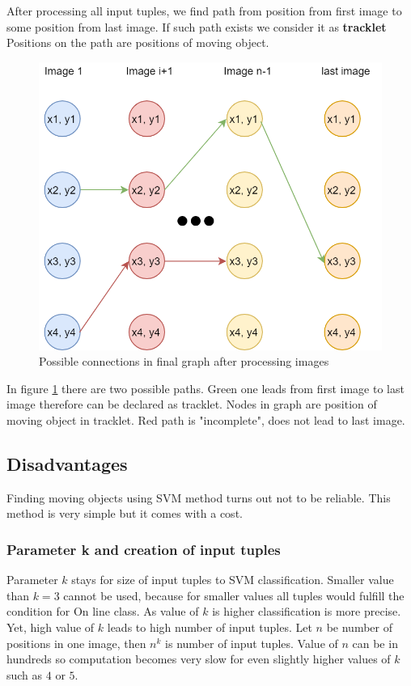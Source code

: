 After processing all input tuples, we find path from position from first image to some position from last image. If such path exists we consider it as \textbf{tracklet} Positions on the path are positions of moving object.

\begin{figure}[!h]
    \centering
    \includegraphics[width=0.8\linewidth]{chapters/images/SVM_graph.PNG}
    \caption{Possible connections in final graph after processing images}
    \label{fig:svm_result_graph}
\end{figure}

In figure \ref{fig:svm_result_graph} there are two possible paths. Green one leads from first image to last image therefore can be declared as tracklet. Nodes in graph are position of moving object in tracklet. Red path is "incomplete", does not lead to last image. 

\subsection{Disadvantages}

Finding moving objects using SVM method turns out not to be reliable. This method is very simple but it comes with a cost.


\subsubsection{Parameter k and creation of input tuples}
Parameter $k$ stays for size of input tuples to SVM classification. Smaller value than $k=3$ cannot be used, because for smaller values all tuples would fulfill the condition for On line class. As value of $k$ is higher classification is more precise. Yet, high value of $k$ leads to high number of input tuples. Let $n$ be number of positions in one image, then $n^k$ is number of input tuples. Value of $n$ can be in hundreds so computation becomes very slow for even slightly higher values of $k$ such as $4$ or $5$.    


